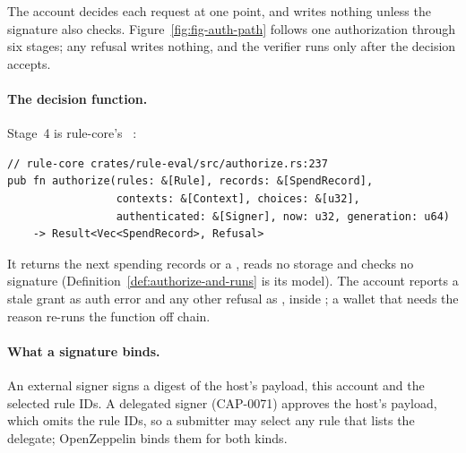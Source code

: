 The account decides each request at one point, and writes nothing unless the
signature also checks. Figure~\ref{fig:fig-auth-path} follows one
authorization through six stages; any refusal writes nothing, and the verifier
runs only after the decision accepts.


\paragraph{The decision function.} Stage~4 is rule-core's
~:
\begin{Verbatim}[fontsize=\scriptsize,xleftmargin=1em]
// rule-core crates/rule-eval/src/authorize.rs:237
pub fn authorize(rules: &[Rule], records: &[SpendRecord],
                 contexts: &[Context], choices: &[u32],
                 authenticated: &[Signer], now: u32, generation: u64)
    -> Result<Vec<SpendRecord>, Refusal>
\end{Verbatim}
It returns the next spending records or a , reads no storage and
checks no signature (Definition~\ref{def:authorize-and-runs} is its model). The
account reports a stale grant as auth error  and
any other refusal as , inside
; a wallet that needs the reason re-runs the function off
chain.

\paragraph{What a signature binds.} An external signer signs a digest of the
host's payload, this account and the selected rule IDs. A delegated signer
(CAP-0071) approves the host's payload, which omits the rule IDs, so a submitter
may select any rule that lists the delegate; OpenZeppelin 
binds them for both kinds.
